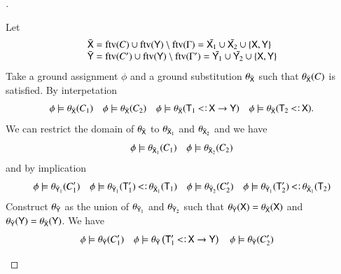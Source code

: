 \documentclass{report}
\begin{document}
\begin{proof}[]
\begin{indcase}{\sdapp}
\begin{displaymath}
      \end{displaymath}
      Let
      \begin{displaymath}
        \begin{array}{l}
          \bar{\textsf{X}} = \mathop{\rm ftv}\nolimits(C)\cup\mathop{\rm ftv}\nolimits(\textsf{Y})\setminus\mathop{\rm ftv}\nolimits(\Gamma)=\bar{\textsf{X}_1}\cup\bar{\textsf{X}_2}\cup\left\{\textsf{X},\textsf{Y}\right\}\\
          \bar{\textsf{Y}} = \mathop{\rm ftv}\nolimits(C')\cup\mathop{\rm ftv}\nolimits(\textsf{Y})\setminus\mathop{\rm ftv}\nolimits(\Gamma')=\bar{\textsf{Y}_1}\cup\bar{\textsf{Y}_2}\cup\left\{\textsf{X},\textsf{Y}\right\}
        \end{array}
      \end{displaymath}
      Take a ground assignment $\phi$ and a ground substitution $\theta_{\bar{\textsf{X}}}$ such that
      $\theta_{\bar{\textsf{X}}}(C)$ is satisfied. By interpetation
      \begin{displaymath}
        \phi\csat\theta_{\bar{\type{X}}}(C_1)\quad
        \phi\csat\theta_{\bar{\type{X}}}(C_2)\quad
        \phi\csat\theta_{\bar{\type{X}}}(\type{T}_1\subtype\type{X}\fun\type{Y})\quad
        \phi\csat\theta_{\bar{\type{X}}}(\type{T}_2\subtype\type{X})\textrm{.}
      \end{displaymath}
      We can restrict the domain of $\theta_{\bar{\textsf{X}}}$ to $\theta_{\bar{\textsf{X}}_1}$
      and $\theta_{\bar{\textsf{X}}_2}$ and we have
      \begin{displaymath}
        \phi\models\theta_{\bar{\textsf{X}}_1}(C_1)\quad
        \phi\models\theta_{\bar{\textsf{X}}_2}(C_2)
      \end{displaymath}
      and by implication
      \begin{displaymath}
        \phi\csat\theta_{\bar{\type{Y}}_1}(C_1')\quad
        \phi\csat\theta_{\bar{\type{Y}}_1}(\type{T}_1')\subtype\theta_{\bar{\type{X}}_1}(\type{T}_1)\quad
        \phi\csat\theta_{\bar{\type{Y}}_2}(C_2')\quad
        \phi\csat\theta_{\bar{\type{Y}}_1}(\type{T}_2')\subtype\theta_{\bar{\type{X}}_1}(\type{T}_2)
      \end{displaymath}
      Construct $\theta_{\bar{\textsf{Y}}}$ as the union of $\theta_{\bar{\textsf{Y}}_1}$ and $\theta_{\bar{\textsf{Y}}_2}$
      such that $\theta_{\bar{\textsf{Y}}}(\textsf{X})=\theta_{\bar{\textsf{X}}}(\textsf{X})$ and
      $\theta_{\bar{\textsf{Y}}}(\textsf{Y})=\theta_{\bar{\textsf{X}}}(\textsf{Y})$. We have
      \begin{displaymath}
        \phi\csat\theta_{\bar{\type{Y}}}(C_1')\quad
        \phi\csat\theta_{\bar{\type{Y}}}\lrp{\type{T}_1'\subtype\type{X}\fun\type{Y}}\quad
        \phi\csat\theta_{\bar{\type{Y}}}(C_2')\quad

\end{displaymath}
\end{indcase}
\end{proof}
\end{document}
